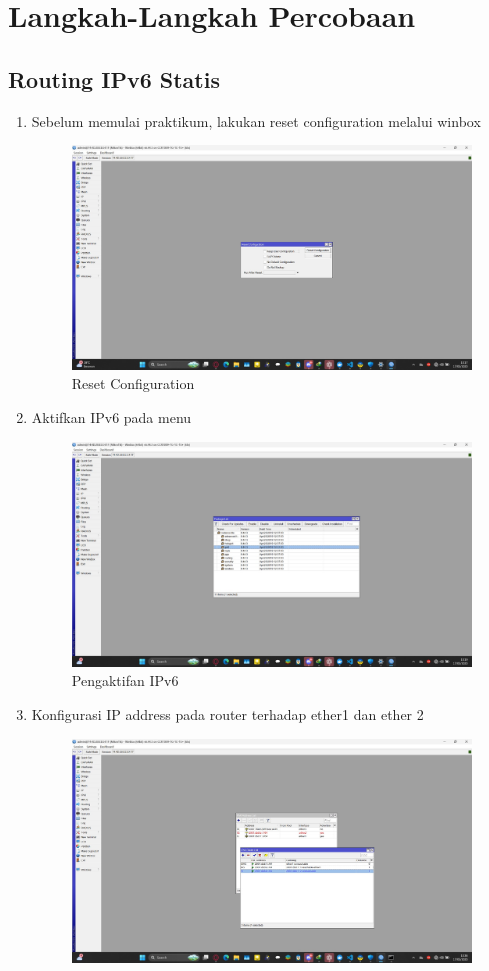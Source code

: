 
\section{Langkah-Langkah Percobaan}

\subsection{Routing IPv6 Statis}

\begin{enumerate}
  \item Sebelum memulai praktikum, lakukan reset configuration melalui winbox
   \begin{figure}[H]
    \centering
    \includegraphics[width=0.5\linewidth]{P1/img/7.jpeg}
    \caption{Reset Configuration}
    \label{fig:inirujukan}
  \end{figure}
  \item Aktifkan IPv6 pada menu
   \begin{figure}[H]
    \centering
    \includegraphics[width=0.5\linewidth]{P1/img/8.jpeg}
    \caption{Pengaktifan IPv6}
    \label{fig:inirujukan}
  \end{figure}
  \item Konfigurasi IP address pada router terhadap ether1 dan ether 2
   \begin{figure}[H]
    \centering
    \includegraphics[width=0.5\linewidth]{P1/img/9.jpeg}

\end{figure}
\end{enumerate}

